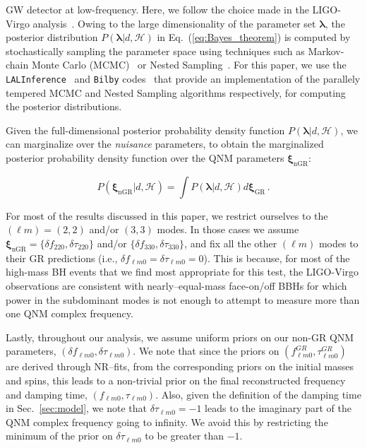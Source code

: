 \documentclass[twocolumn,prd,aps,superscriptaddress,preprintnumbers,tightenlines,showpacs,nofootinbib,eqsecnum,amsfonts,amsmath]{revtex4-1}
\newcommand{\blambda}{\bm{\lambda}}
\newcommand{\bxigr}{\bm{\xi}_{\text{GR}}}
\newcommand{\bxingr}{\bm{\xi}_{\text{nGR}}}
\newcommand{\df}[1]{\delta f_{\text{#1}}}
\newcommand{\dtau}[1]{\delta \tau_{\text{#1}}}
\begin{document}
GW detector at low-frequency. Here, we follow the choice made in the LIGO-Virgo analysis~\cite{LIGOScientific:2018mvr,Abbott:2020niy}. Owing to the large dimensionality of the parameter set $\blambda$, the posterior distribution $P(\blambda | d, \mathcal{H})$ in Eq.~(\ref{eq:Bayes_theorem}) is computed by stochastically sampling the parameter space using techniques such as Markov-chain Monte Carlo (MCMC)~\cite{Metropolis:1953am,Hastings:1970aa} or Nested Sampling~\cite{Skilling:2006gxv}. For this paper, we use the \verb+LALInference+~\cite{Veitch:2014wba} and \verb+Bilby+ codes~\cite{Ashton:2018jfp,Smith:2019ucc,Speagle_2020} that provide an implementation of the parallely tempered MCMC and Nested Sampling algorithms respectively, for computing the posterior distributions.

Given the full-dimensional posterior probability density function $P(\blambda | d, \mathcal{H})$, we can marginalize over the \emph{nuisance} parameters, to obtain the marginalized posterior probability density function over the QNM parameters $\bxingr$:

\begin{equation}
P(\bxingr | d, \mathcal{H})= \int P(\blambda | d, \mathcal{H}) d\bxigr\,.
\end{equation}

For most of the results discussed in this paper, we restrict ourselves
to the $(\ell m) = (2,2)$ and/or $(3,3)$ modes. In those cases we assume $\bxingr = \{\df{220},\dtau{220}\}$ and/or $
\{\df{330},\dtau{330}\}$, and fix all the other $(\ell m)$ modes to their GR predictions (i.e., $\delta f_{\ell m 0} = \delta
\tau_{\ell m 0} = 0$). This is because, for most of the high-mass BH
events that we find most appropriate for this test, the LIGO-Virgo
observations are consistent with nearly--equal-mass face-on/off BBHs
for which power in the subdominant modes is not enough to
attempt to measure more than one QNM complex frequency.

Lastly, throughout our analysis, we assume uniform priors on our non-GR QNM
parameters, $(\delta f_{\ell m 0},\delta \tau_{\ell m 0})$. We note that
since the priors on $( f_{\ell m 0}^{GR},\tau_{\ell m 0}^{GR})$ are
derived through NR--fits, from the corresponding priors on the initial
masses and spins, this leads to a non-trivial prior on the final
reconstructed frequency and damping time, $( f_{\ell m 0},\tau_{\ell m
  0})$. Also, given the definition of the damping time in
Sec.~\ref{sec:model}, we note that $\delta \tau_{\ell m 0} = -1$ leads
to the imaginary part of the QNM complex frequency going to infinity. We avoid
this by restricting the minimum of the prior on $\delta \tau_{\ell m
  0}$ to be greater than $-1$.
\end{document}
